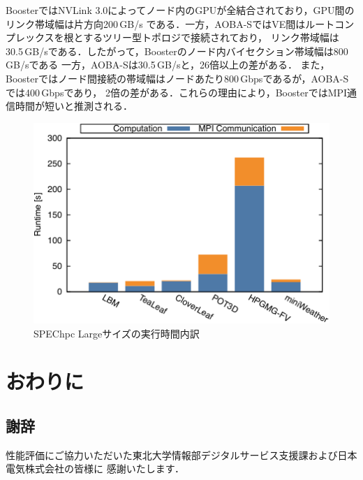 ﻿\documentclass[submit,techrep,noauthor]{ipsj}
\begin{document}
BoosterではNVLink 3.0によってノード内のGPUが全結合されており，GPU間のリンク帯域幅は片方向200\,GB/s
である．一方，AOBA-SではVE間はルートコンプレックスを根とするツリー型トポロジで接続されており，
リンク帯域幅は30.5\,GB/sである．したがって，Boosterのノード内バイセクション帯域幅は800\,GB/sである
一方，AOBA-Sは30.5\,GB/sと，26倍以上の差がある．
また，Boosterではノード間接続の帯域幅はノードあたり800\,Gbpsであるが，AOBA-Sでは400\,Gbpsであり，
2倍の差がある．これらの理由により，BoosterではMPI通信時間が短いと推測される．

\begin{figure}[tb]
  \centering
  \includegraphics{figs/spechpc_profile.pdf}
  \caption{SPEChpc Largeサイズの実行時間内訳}\label{fig:spechpc-profile}
\end{figure}

\section{おわりに}

\subsection*{謝辞}

性能評価にご協力いただいた東北大学情報部デジタルサービス支援課および日本電気株式会社の皆様に
感謝いたします．



\end{document}
